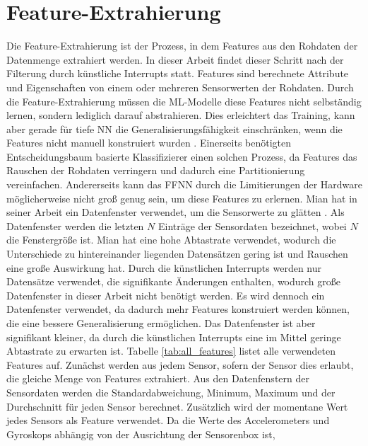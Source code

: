 \section{Feature-Extrahierung}
Die Feature-Extrahierung ist der Prozess, in dem Features aus den Rohdaten der Datenmenge extrahiert werden.
In dieser Arbeit findet dieser Schritt nach der Filterung durch künstliche Interrupts statt.
Features sind berechnete Attribute und Eigenschaften von einem oder mehreren Sensorwerten der Rohdaten.
\newpage
Durch die Feature-Extrahierung müssen die ML-Modelle diese Features nicht selbständig lernen, sondern lediglich darauf abstrahieren.
Dies erleichtert das Training, kann aber gerade für tiefe NN die Generalisierungsfähigkeit einschränken,
wenn die Features nicht manuell konstruiert wurden \cite{seide2011feature}.
Einerseits benötigten Entscheidungsbaum basierte Klassifizierer einen solchen Prozess,
da Features das Rauschen der Rohdaten verringern und dadurch eine Partitionierung vereinfachen.
Andererseits kann das FFNN durch die Limitierungen der Hardware möglicherweise nicht groß genug sein, um diese Features zu erlernen.
\newline
\newline
Mian hat in seiner Arbeit ein Datenfenster verwendet, um die Sensorwerte zu glätten \cite{naveedThesis}.
Als Datenfenster werden die letzten $N$ Einträge der Sensordaten bezeichnet, wobei $N$ die Fenstergröße ist.
Mian hat eine hohe Abtastrate verwendet, wodurch die Unterschiede zu hintereinander liegenden Datensätzen gering ist und Rauschen eine große Auswirkung hat.
Durch die künstlichen Interrupts werden nur Datensätze verwendet, die signifikante Änderungen enthalten,
wodurch große Datenfenster in dieser Arbeit nicht benötigt werden.
Es wird dennoch ein Datenfenster verwendet, da dadurch mehr Features konstruiert werden können, die eine bessere Generalisierung ermöglichen.
Das Datenfenster ist aber signifikant kleiner, da durch die künstlichen Interrupts eine im Mittel geringe Abtastrate zu erwarten ist.
\newline
\newline
Tabelle \ref{tab:all_features} listet alle verwendeten Features auf.
Zunächst werden aus jedem Sensor, sofern der Sensor dies erlaubt, die gleiche Menge von Features extrahiert.
Aus den Datenfenstern der Sensordaten werden die Standardabweichung, Minimum, Maximum und der Durchschnitt für jeden Sensor berechnet.
Zusätzlich wird der momentane Wert jedes Sensors als Feature verwendet.
Da die Werte des Accelerometers und Gyroskops abhängig von der Ausrichtung der Sensorenbox ist,
